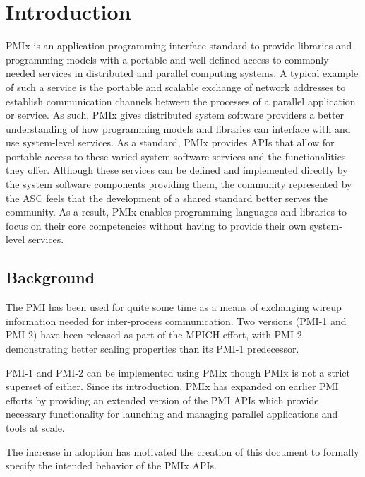 \chapter{Introduction}

\label{chap:intro}

\ac{PMIx} is an application programming interface standard to provide
libraries and programming models with a portable and well-defined access to commonly
needed services in distributed and parallel computing systems.
A typical example of such a service is the portable and scalable exchange of network 
addresses to establish communication channels between the processes of a parallel 
application or service.
As such, \ac{PMIx} gives distributed system software providers a better understanding of how
programming models and libraries can interface with and use system-level services.
As a standard, \ac{PMIx} provides \acp{API} that allow for
portable access to these varied system software services and the
functionalities they offer.  Although these services can be defined and implemented directly by the
system software components providing them, the 
community represented by the \ac{ASC}
feels that the development of a shared standard better serves the
community.  
As a result, \ac{PMIx} enables programming languages and libraries to focus on their core
competencies without having to provide their own system-level services.

\section{Background}
\label{chap:introduction:background}

The \ac{PMI} has been used for quite some time as a means of exchanging wireup information needed for inter-process communication.  
Two versions (PMI-1 and PMI-2) have been released as part of the MPICH effort, with PMI-2 demonstrating better scaling properties than its PMI-1 predecessor.

PMI-1 and PMI-2 can be implemented using \ac{PMIx} though \ac{PMIx} is not a strict superset of either.
Since its introduction, \ac{PMIx} has expanded 
on earlier \ac{PMI} efforts by 
providing an extended version of the \ac{PMI} \acp{API} which provide necessary functionality for launching and managing parallel applications and tools at scale.

The increase in adoption has motivated the creation of this document to formally specify the intended behavior of the \ac{PMIx} \acp{API}.

